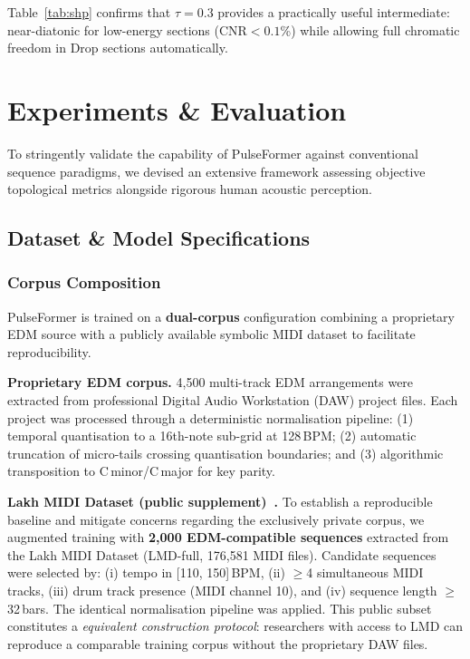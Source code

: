\documentclass[conference]{IEEEtran}
\begin{document}
Table~\ref{tab:shp} confirms that $\tau\!=\!0.3$ provides a practically useful intermediate: near-diatonic for low-energy sections (CNR$<\!0.1$\%) while allowing full chromatic freedom in Drop sections automatically.

\section{Experiments \& Evaluation}
To stringently validate the capability of PulseFormer against conventional sequence paradigms, we devised an extensive framework assessing objective topological metrics alongside rigorous human acoustic perception.

\subsection{Dataset \& Model Specifications}
\label{sec:dataset}

\subsubsection*{Corpus Composition}

PulseFormer is trained on a \textbf{dual-corpus} configuration combining a
proprietary EDM source with a publicly available symbolic MIDI dataset to
facilitate reproducibility.

\noindent\textbf{Proprietary EDM corpus.}
4,500 multi-track EDM arrangements were extracted from professional
Digital Audio Workstation (DAW) project files.
Each project was processed through a deterministic normalisation pipeline:
(1) temporal quantisation to a 16th-note sub-grid at 128\,BPM;
(2) automatic truncation of micro-tails crossing quantisation boundaries; and
(3) algorithmic transposition to C\,minor/C\,major for key parity.

\noindent\textbf{Lakh MIDI Dataset (public supplement)~\cite{raffel2016lakh}.}
To establish a reproducible baseline and mitigate concerns regarding
the exclusively private corpus, we augmented training with
\textbf{2,000 EDM-compatible sequences} extracted from the
Lakh MIDI Dataset (LMD-full, 176,581 MIDI files).
Candidate sequences were selected by: (i) tempo in [110, 150]\,BPM,
(ii) $\geq$4 simultaneous MIDI tracks, (iii) drum track presence
(MIDI channel 10), and (iv) sequence length $\geq$ 32\,bars.
The identical normalisation pipeline was applied.
This public subset constitutes a \emph{equivalent construction protocol}:
researchers with access to LMD can reproduce a comparable training corpus
without the proprietary DAW files.
\end{document}
